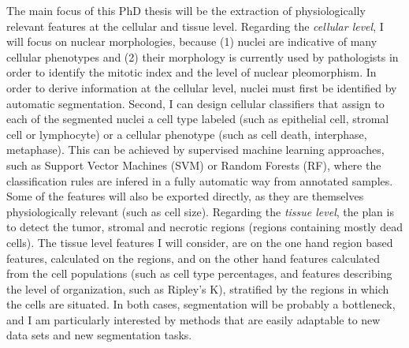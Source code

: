 \documentclass[a4paper,10pt,twocolumn]{article}
\begin{document}
The main focus of this PhD thesis will be the extraction of
physiologically relevant features at the cellular and tissue
level. Regarding the {\em cellular level}, I will focus on nuclear morphologies,
because (1) nuclei are indicative of many cellular
phenotypes\citep{Chow2012} and (2) their morphology is currently used by
pathologists in order to identify the mitotic index and the level of
nuclear pleomorphism\citep{Elston1991}. In order to derive information
at the cellular level, nuclei must first be identified by automatic
segmentation. Second, I can design cellular classifiers that assign
to each of the segmented nuclei a cell type labeled (such as
epithelial cell, stromal cell or 
lymphocyte) or a cellular phenotype (such as cell death, interphase,
metaphase). This can be achieved by supervised machine learning approaches,
such as Support Vector Machines (SVM) or Random Forests (RF), 
where the classification rules are infered in a fully automatic way from
annotated samples. Some of the features will also be exported directly, as they
are themselves physiologically relevant (such as cell size). 
Regarding the {\em tissue level}, the plan is to detect the tumor,
stromal and necrotic regions (regions containing mostly dead
cells). The tissue level features I will consider, are on the one hand
region based features, calculated on the regions, and on the other
hand features calculated from the cell populations (such as cell type
percentages, and features describing the level of organization, such
as Ripley's K), stratified by the regions in which the cells are situated. 
In both cases, segmentation will be probably a bottleneck, and I am
particularly interested by methods that are easily adaptable to new
data sets and new segmentation tasks.

%
\end{document}

